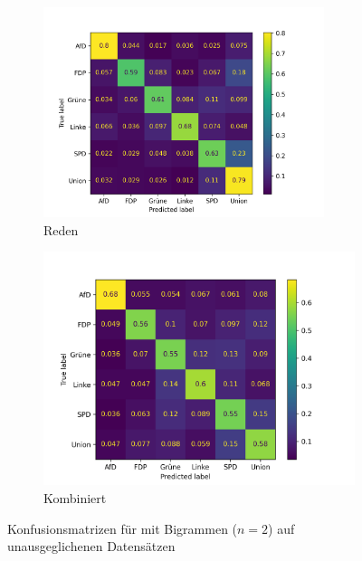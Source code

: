 \begin{figure}[H]
\begin{subfigure}{0.5\textwidth}
      \includegraphics[width=0.9\textwidth]{data/images/modeling/fasttext/none/speeches_confusion_matrix.png}
      \caption{Reden} \label{sfig:confusionMatrixFastTextSpeechesUnbalanced}
    \end{subfigure}
    \hfill
    \begin{subfigure}{0.49\textwidth}
      \includegraphics[width=\textwidth]{data/images/modeling/fasttext/none/all_confusion_matrix.png}
      \caption{Kombiniert} \label{sfig:confusionMatrixFastTextAllUnbalanced}
    \end{subfigure}
    \caption{Konfusionsmatrizen für \ft mit Bigrammen (\(n = \num{2}\)) auf unausgeglichenen Datensätzen} \label{fig:unbalancedConfusionMatrixFastText}
\end{figure}

